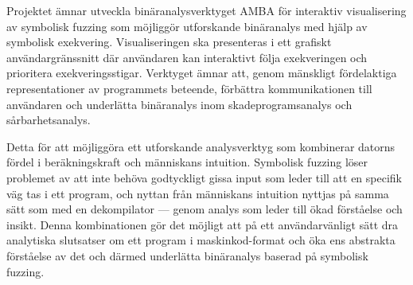 
Projektet ämnar utveckla binäranalysverktyget AMBA för interaktiv visualisering
av symbolisk fuzzing som möjliggör utforskande binäranalys med hjälp av
symbolisk exekvering. Visualiseringen ska presenteras i ett grafiskt
användargränssnitt där användaren kan interaktivt följa exekveringen och
prioritera exekveringsstigar. Verktyget ämnar att, genom mänskligt fördelaktiga
representationer av programmets beteende, förbättra kommunikationen till
användaren och underlätta binäranalys inom skadeprogramsanalys och
sårbarhetsanalys.

Detta för att möjliggöra ett utforskande analysverktyg som kombinerar datorns
fördel i beräkningskraft och människans intuition. Symbolisk fuzzing löser
problemet av att inte behöva godtyckligt gissa input som leder till att en
specifik väg tas i ett program, och nyttan från människans intuition nyttjas på
samma sätt som med en dekompilator --- genom analys som leder till ökad
förståelse och insikt. Denna kombinationen gör det möjligt att på ett
användarvänligt sätt dra analytiska slutsatser om ett program i
maskinkod-format och öka ens abstrakta förståelse av det och därmed underlätta
binäranalys baserad på symbolisk fuzzing.
